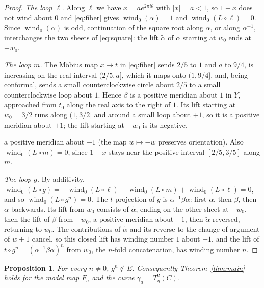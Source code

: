 \documentclass[11pt]{article}
\newcommand{\wind}{\operatorname{wind}}
\newtheorem{proposition}[theorem]{Proposition}
\theoremstyle{remark}
\numberwithin{equation}{section}
\begin{document}
\begin{proof}
\emph{The loop $\ell$.} Along $\ell$ we have $x=ae^{2\pi i\theta}$ with
$|x|=a<1$, so $1-x$ does not wind about $0$ and \eqref{eq:fiber} gives
$\wind_0(\alpha)=1$ and $\wind_0(L\circ\ell)=0$. Since $\wind_0(\alpha)$
is odd, continuation of the square root along
$\alpha$, or along $\alpha^{-1}$, interchanges the two sheets of
\eqref{eq:square}: the lift $\tilde\alpha$ of $\alpha$ starting at $w_0$
ends at $-w_0$.

\emph{The loop $m$.} The M\"obius map $x\mapsto t$ in \eqref{eq:fiber}
sends $2/5$ to $1$ and $a$ to $9/4$, is increasing on the real interval
$(2/5,a]$, which it maps onto $(1,9/4]$, and, being conformal, sends a
small counterclockwise circle about $2/5$ to a small counterclockwise loop
about $1$. Hence $\beta$ is a positive meridian about $1$ in $Y$,
approached from $t_0$ along the real axis to the right of $1$. Its lift
starting at $w_0=3/2$ runs along $(1,3/2]$ and around a small loop about
$+1$, so it is a positive meridian about $+1$; the lift starting at $-w_0$
is its negative,

a positive meridian about $-1$ (the map $w\mapsto-w$
preserves orientation). Also $\wind_0(L\circ m)=0$, since $1-x$ stays near
the positive interval $[2/5,3/5]$ along $m$.

\emph{The loop $g$.} By additivity,
$\wind_0(L\circ g)=-\wind_0(L\circ\ell)+\wind_0(L\circ m)+\wind_0(L\circ\ell)=0$,
and so $\wind_0(L\circ g^n)=0$. The $t$-projection of $g$ is
$\alpha^{-1}\beta\alpha$: first $\alpha$, then $\beta$, then $\alpha$
backwards. Its lift from $w_0$ consists of $\tilde\alpha$, ending on the
other sheet at $-w_0$, then the lift of $\beta$ from $-w_0$, a positive
meridian about $-1$, then $\tilde\alpha$ reversed, returning to $w_0$. The
contributions of $\tilde\alpha$ and its reverse to the change of argument
of $w+1$ cancel, so this closed lift has winding number $1$ about $-1$,
and the lift of $t\circ g^n=(\alpha^{-1}\beta\alpha)^n$ from $w_0$, the
$n$-fold concatenation, has winding number $n$.
\end{proof}

\begin{proposition}\label{prop:notinE}
For every $n\ne0$, $g^n\notin E$. Consequently Theorem~\ref{thm:main}
holds for the model map $F_a$ and the curve $\gamma_a=T_\eta^2(C)$.
\end{proposition}
\end{document}
